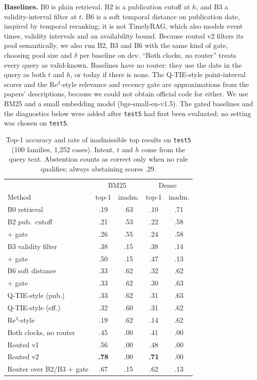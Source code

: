 \documentclass[11pt]{article}
\begin{document}
\textbf{Baselines.} B0 is plain retrieval. B2 is a publication cutoff at $h$, and B3 a validity-interval filter at $t$. B6 is a soft temporal distance on publication date, inspired by temporal reranking; it is not TimelyRAG, which also models event times, validity intervals and an availability bound. Because routed v2 filters its pool semantically, we also run B2, B3 and B6 with the same kind of gate, choosing pool size and $\delta$ per baseline on dev. ``Both clocks, no router'' treats every query as valid-known. Baselines have no router: they use the date in the query as both $t$ and $h$, or today if there is none. The Q-TIE-style point-interval scorer and the Re$^3$-style relevance and recency gate are approximations from the papers' descriptions, because we could not obtain official code for either. We use BM25 and a small embedding model (bge-small-en-v1.5). The gated baselines and the diagnostics below were added after \texttt{test5} had first been evaluated; no setting was chosen on \texttt{test5}.

\begin{table}[t]\centering\small
\setlength{\tabcolsep}{4pt}
\begin{tabular}{lcccc}\toprule
 & \multicolumn{2}{c}{BM25} & \multicolumn{2}{c}{Dense} \\
Method & top-1 & inadm. & top-1 & inadm. \\\midrule
B0 retrieval & .19 & .63 & .10 & .71 \\
\midrule
B2 pub.\ cutoff & .21 & .53 & .22 & .58 \\
\quad + gate & .26 & .55 & .24 & .58 \\
B3 validity filter & .38 & .15 & .38 & .14 \\
\quad + gate & .50 & .15 & .47 & .13 \\
B6 soft distance & .33 & .62 & .32 & .62 \\
\quad + gate & .33 & .62 & .30 & .63 \\
Q-TIE-style (pub.) & .33 & .62 & .31 & .63 \\
Q-TIE-style (eff.) & .32 & .60 & .31 & .62 \\
Re$^3$-style & .19 & .62 & .14 & .62 \\
\midrule
Both clocks, no router & .45 & .00 & .41 & .00 \\
Routed v1 & .56 & .00 & .48 & .00 \\
Routed v2 & \textbf{.78} & .00 & \textbf{.71} & .00 \\
\midrule
Router over B2/B3 + gate & .67 & .15 & .62 & .13 \\
\bottomrule
\end{tabular}
\caption{Top-1 accuracy and rate of inadmissible top results on \texttt{test5} (100 families, 1{,}252 cases). Intent, $t$ and $h$ come from the query text. Abstention counts as correct only when no rule qualifies; always abstaining scores .29.}\label{tab:main}
\end{table}
\end{document}
